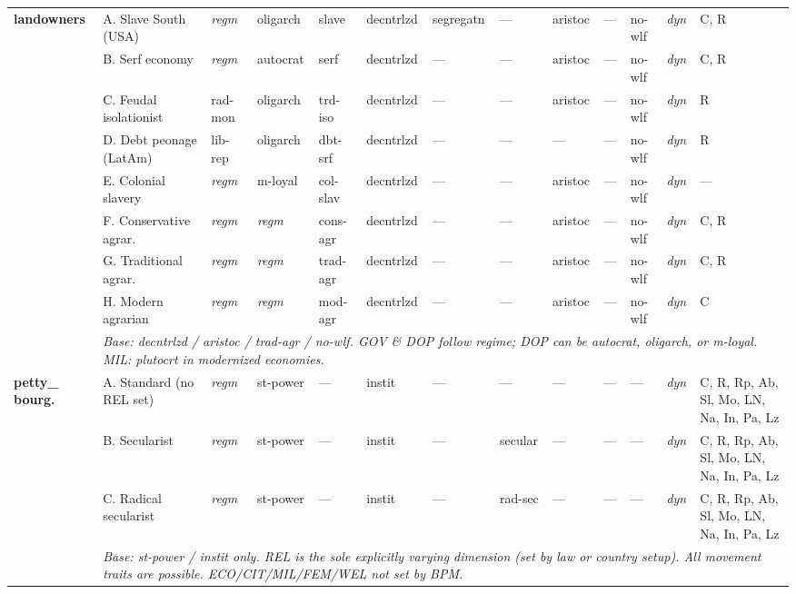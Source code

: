 \documentclass[a4paper]{article}
\newcommand{\nd}{---}
\newcommand{\reg}{\textit{regm}}
\newcommand{\minorrow}[2]{\rowcolor{minorRow} #1 & \multicolumn{12}{p{22cm}|}{\textit{#2}} \\}
\begin{document}
\begin{footnotesize}
\begin{longtable}{|p{1.8cm}|p{2.3cm}|p{1.55cm}|p{1.65cm}|p{1.65cm}|p{1.3cm}|p{1.5cm}|p{1.5cm}|p{1.5cm}|p{1.3cm}|p{1.45cm}|p{1.0cm}|p{2.65cm}|}
\multirow{9}{*}{\cellcolor{instHdr}\textbf{landowners}} &
  A. Slave South (USA) & \reg & oligarch & slave & decntrlzd & segregatn & \nd & aristoc & \nd & no-wlf & \textit{dyn} & C, R \\ \cline{2-13}
\cellcolor{instHdr} &
  B. Serf economy & \reg & autocrat & serf & decntrlzd & \nd & \nd & aristoc & \nd & no-wlf & \textit{dyn} & C, R \\ \cline{2-13}
\cellcolor{instHdr} &
  C. Feudal isolationist & rad-mon & oligarch & trd-iso & decntrlzd & \nd & \nd & aristoc & \nd & no-wlf & \textit{dyn} & R \\ \cline{2-13}
\cellcolor{instHdr} &
  D. Debt peonage (LatAm) & lib-rep & oligarch & dbt-srf & decntrlzd & \nd & \nd & \nd & \nd & no-wlf & \textit{dyn} & R \\ \cline{2-13}
\cellcolor{instHdr} &
  E. Colonial slavery & \reg & m-loyal & col-slav & decntrlzd & \nd & \nd & aristoc & \nd & no-wlf & \textit{dyn} & \nd \\ \cline{2-13}
\cellcolor{instHdr} &
  F. Conservative agrar. & \reg & \reg & cons-agr & decntrlzd & \nd & \nd & aristoc & \nd & no-wlf & \textit{dyn} & C, R \\ \cline{2-13}
\cellcolor{instHdr} &
  G. Traditional agrar. & \reg & \reg & trad-agr & decntrlzd & \nd & \nd & aristoc & \nd & no-wlf & \textit{dyn} & C, R \\ \cline{2-13}
\cellcolor{instHdr} &
  H. Modern agrarian & \reg & \reg & mod-agr & decntrlzd & \nd & \nd & aristoc & \nd & no-wlf & \textit{dyn} & C \\ \cline{2-13}
\minorrow{\cellcolor{instHdr}}{Base: decntrlzd / aristoc / trad-agr / no-wlf. GOV \& DOP follow regime; DOP can be autocrat, oligarch, or m-loyal. MIL: plutocrt in modernized economies.}
\hline

\multirow{4}{*}{\cellcolor{instHdr}\textbf{petty\_ bourg.}} &
  A. Standard (no REL set) & \reg & st-power & \nd & instit & \nd & \nd & \nd & \nd & \nd & \textit{dyn} & C, R, Rp, Ab, Sl, Mo, LN, Na, In, Pa, Lz \\ \cline{2-13}
\cellcolor{instHdr} &
  B. Secularist & \reg & st-power & \nd & instit & \nd & secular & \nd & \nd & \nd & \textit{dyn} & C, R, Rp, Ab, Sl, Mo, LN, Na, In, Pa, Lz \\ \cline{2-13}
\cellcolor{instHdr} &
  C. Radical secularist & \reg & st-power & \nd & instit & \nd & rad-sec & \nd & \nd & \nd & \textit{dyn} & C, R, Rp, Ab, Sl, Mo, LN, Na, In, Pa, Lz \\ \cline{2-13}
\minorrow{\cellcolor{instHdr}}{Base: st-power / instit only. REL is the sole explicitly varying dimension (set by law or country setup). All movement traits are possible. ECO/CIT/MIL/FEM/WEL not set by BPM.}
\hline


\end{longtable}
\end{footnotesize}
\end{document}
